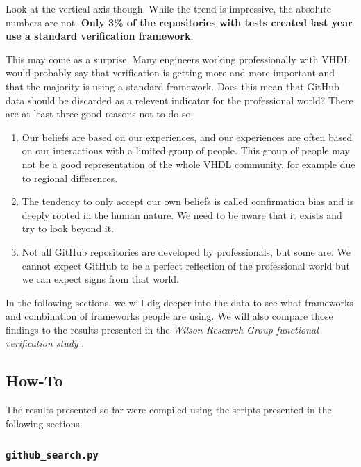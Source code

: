 \documentclass[]{report}
\providecommand{\tightlist}{%
  \setlength{\itemsep}{0pt}\setlength{\parskip}{0pt}}
\begin{document}
Look at the vertical axis though. While the trend is impressive, the absolute numbers are not. \textbf{Only 3\% of the repositories with tests created last year use a standard verification framework}.

This may come as a surprise. Many engineers working professionally with VHDL would probably say that verification is getting more and more important and that the majority is using a standard framework. Does this mean that GitHub data should be discarded as a relevent indicator for the professional world? There are at least three good reasons not to do so:

\begin{enumerate}
\def\labelenumi{\arabic{enumi}.}
\tightlist
\item
  Our beliefs are based on our experiences, and our experiences are often based on our interactions with a limited group of people. This group of people may not be a good representation of the whole VHDL community, for example due to regional differences.
\item
  The tendency to only accept our own beliefs is called \href{https://en.wikipedia.org/wiki/Confirmation_bias}{confirmation bias} and is deeply rooted in the human nature. We need to be aware that it exists and try to look beyond it.
\item
  Not all GitHub repositories are developed by professionals, but some are. We cannot expect GitHub to be a perfect reflection of the professional world but we can expect signs from that world.
\end{enumerate}

In the following sections, we will dig deeper into the data to see what frameworks and combination of frameworks people are using. We will also compare those findings to the results presented in the \emph{Wilson Research Group functional verification study} \autocite{wilson18}.

\hypertarget{how-to}{%
\subsection{How-To}\label{how-to}}

The results presented so far were compiled using the scripts presented in the following sections.

\hypertarget{github-search}{%
\subsubsection{\texorpdfstring{\texttt{github\_search.py}}{github\_search.py}}\label{github-search}}
\end{document}
